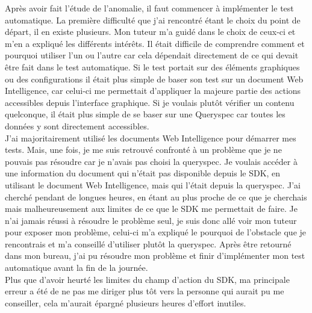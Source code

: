 Apr\`{e}s avoir fait l'\'{e}tude de l'anomalie, il faut commencer \`{a} impl\'{e}menter le test automatique. La premi\`{e}re difficult\'{e} que j'ai rencontr\'{e} \'{e}tant le choix du point de d\'{e}part, il en existe plusieurs. Mon tuteur m'a guid\'{e} dans le choix de ceux-ci et m'en a expliqu\'{e} les diff\'{e}rents int\'{e}r\^{e}ts. Il \'{e}tait difficile de comprendre comment et pourquoi utiliser l'un ou l'autre car cela d\'{e}pendait directement de ce qui devait \^{e}tre fait dans le test automatique. Si le test portait sur des \'{e}l\'{e}ments graphiques ou des configurations il \'{e}tait plus simple de baser son test sur un document Web Intelligence, car celui-ci me permettait d'appliquer la majeure partie des actions accessibles depuis l'interface graphique. Si je voulais plut\^{o}t v\'{e}rifier un contenu quelconque, il \'{e}tait plus simple de se baser sur une \gls{Queryspec} car toutes les donn\'{e}es y sont directement accessibles. \\

J'ai majoritairement utilis\'{e} les documents Web Intelligence pour d\'{e}marrer mes tests. Mais, une fois, je me suis retrouv\'{e} confront\'{e} \`{a} un probl\`{e}me que je ne pouvais pas r\'{e}soudre car je n'avais pas choisi la queryspec. Je voulais acc\'{e}der \`{a} une information du document qui n'\'{e}tait pas disponible depuis le \gls{SDK}, en utilisant le document Web Intelligence, mais qui l'\'{e}tait depuis la queryspec. J'ai cherch\'{e} pendant de longues heures, en \'{e}tant au plus proche de ce que je cherchais mais malheureusement aux limites de ce que le \gls{SDK} me permettait de faire. Je n'ai jamais r\'{e}ussi \`{a} r\'{e}soudre le probl\`{e}me seul, je suis donc all\'{e} voir mon tuteur pour exposer mon probl\`{e}me, celui-ci m'a expliqu\'{e} le pourquoi de l'obstacle que je rencontrais et m'a conseill\'{e} d'utiliser plut\^{o}t la queryspec. Apr\`{e}s \^{e}tre retourn\'{e} dans mon bureau, j'ai pu r\'{e}soudre mon probl\`{e}me et finir d'impl\'{e}menter mon test automatique avant la fin de la journ\'{e}e.\\

Plus que d'avoir heurt\'{e} les limites du champ d'action du \gls{SDK}, ma principale erreur a \'{e}t\'{e} de ne pas me diriger plus t\^{o}t vers la personne qui aurait pu me conseiller, cela m'aurait \'{e}pargn\'{e} plusieurs heures d'effort inutiles.\\

